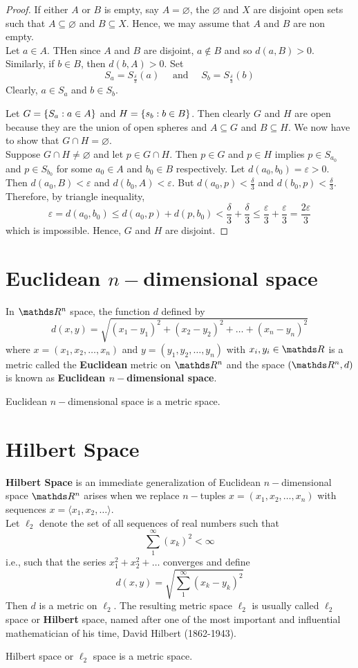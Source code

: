 \documentclass[../main-sheet.tex]{subfiles}
\begin{document}
\begin{proof}
    If either \(A\) or \(B\) is empty, say \(A=\varnothing\), the \(\varnothing\) and \(X\) are disjoint open sets such that \(A\subseteq \varnothing\) and \(B\subseteq X\). Hence, we may assume that \(A\) and \(B\) are non empty.\\
    Let \(a\in A\). THen since \(A\) and \(B\) are disjoint, \(a\notin B\) and so \(d(a,B)>0\). Similarly, if \(b\in B\), then \(d(b,A)>0\). Set 
    \[S_a=S_{\frac{\delta}{3}}(a)\quad \text{ and }\quad S_b=S_{\frac{\delta}{3}}(b)\]
    Clearly, \(a\in S_a\) and \(b\in S_b\).

    Let \(G=\left\{S_a:a\in A\right\}\) and \(H=\left\{s_b:b\in B\right\}\). Then clearly \(G\) and \(H\) are open because they are the union of open spheres and \(A\subseteq G\) and \(B\subseteq H\). We now have to show that \(G\cap H=\varnothing\).\\
    Suppose \(G\cap H\neq \varnothing\)  and let \(p\in G\cap H\). Then \(p\in G \) and \(p\in H\) implies \(p\in S_{a_0}\) and \(p\in S_{b_0}\) for some \(a_0\in A\) and \(b_0 \in B\) respectively. Let \(d(a_0,b_0)=\varepsilon >0\). Then \(d(a_0,B)<\varepsilon\) and \(d(b_0,A)<\varepsilon\). But \(d(a_0,p)<\frac{\delta}{3}\) and \(d(b_0,p)<\frac{\delta}{3}\). Therefore, by triangle inequality,
    \[\varepsilon=d(a_0,b_0)\leq d(a_0,p)+d(p,b_0)<\frac{\delta}{3}+\frac{\delta}{3}\leq\frac{\varepsilon}{3}+\frac{\varepsilon}{3}=\frac{2\varepsilon}{3}\]
    which is impossible. Hence, \(G\) and \(H\) are disjoint.
\end{proof}
\section{Euclidean \(n-\)dimensional space}
In \(\R^n\) space, the function \(d\) defined by
\[d(x,y)=\sqrt{(x_1-y_1)^2+(x_2-y_2)^2+\dots+(x_n-y_n)^2}\]
where \(x=(x_1,x_2,\dots,x_n)\) and \(y=(y_1,y_2,\dots, y_n)\) with \(x_i, y_i \in \R\) is a metric called the \textbf{Euclidean} metric on \(\R^n\) and the space \((\R^n,d)\) is known as \textbf{Euclidean \(n-\)dimensional space}.
\begin{thm}
    Euclidean \(n-\)dimensional space is a metric space.
\end{thm}
\section{Hilbert Space}
\textbf{Hilbert Space} is an immediate generalization    of Euclidean \(n-\)dimensional space \(\R^n\) arises when we replace \(n-\)tuples \(x=(x_1,x_2,\dots,x_n)\) with sequences \(x=\langle x_1,x_2,\dots \rangle\).\\
Let \(\ell_2\) denote the set of all sequences of real numbers such that
\[\sum_1^\infty (x_k)^2<\infty\]
i.e., such that the series \(x_1^2+x_2^2+\dots\) converges and define 
\[d(x,y)=\sqrt{\sum_1^\infty (x_k-y_k)^2}\]
Then \(d\) is a metric on \(\ell_2\). The resulting metric space \(\ell_2\) is usually called \(\ell_2\) space or \textbf{Hilbert} space, named after one of the most important and influential mathematician  of his time, David Hilbert (1862-1943).
\begin{thm}
    Hilbert space or \(\ell_2\) space is a metric space.
\end{thm}
\end{document}
